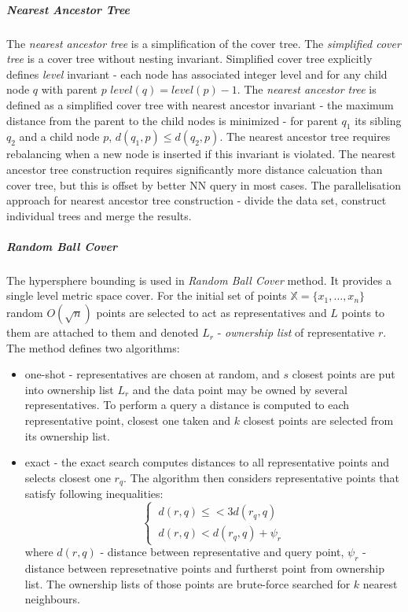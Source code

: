 \subparagraph*{Nearest Ancestor Tree}
The \textit{nearest ancestor tree} is a simplification of
the cover tree\cite{izbickifaster}.
The \textit{simplified cover tree} is a cover tree without nesting invariant.
Simplified cover tree explicitly defines \textit{level} invariant - each node
has associated integer level and for any child node $ q $ with parent $ p $ $ level(q) = level(p) - 1 $. 
The \textit{nearest ancestor tree} is defined as a simplified cover tree with
nearest ancestor invariant - the maximum distance from the parent to the child
nodes is minimized -  for parent $ q_1 $ its sibling $ q_2 $ and a child node $
p $, $ d(q_1, p) \leq d(q_2, p)$\cite{izbickifaster}.
The nearest ancestor tree requires rebalancing when a new node is inserted if
this invariant is violated. 
The nearest ancestor tree construction requires significantly more distance
calcuation than cover tree, but this is offset by better NN query in most
cases\cite{izbickifaster}.
The parallelisation approach for nearest ancestor tree construction - divide the
data set, construct individual trees and merge the results.  

\subparagraph*{Random Ball Cover}
The hypersphere bounding is used in \textit{Random Ball Cover}
method\cite{Cayton6267877}. It provides a single level metric space cover. For
the initial set of points $ \mathbb{X} = \{ x_1, \ldots , x_n \} $ 
random $ O(\sqrt{n}) $ points are selected to act as representatives and 
$ L $ points to them are attached to them and denoted $ L_r $ -
\textit{ownership list} of representative $ r $.
The method defines two algorithms:
\begin{itemize}
  \item one-shot - representatives are chosen at random, and $ s $ closest
  points are put into ownership list $ L_r $ and the data point may be owned by
  several representatives. To perform a query a distance is computed to each
  representative point, closest one taken and $ k $ closest points are selected from its ownership list. 
  \item exact - the exact search computes distances to all representative points
  and selects closest one $ r_q $. The algorithm then considers representative
  points that satisfy following inequalities:
  \[
  \left\{
  \begin{array}{ll} 
  \ d(r,q)  \leq< 3 d(r_q, q) \\
  \ d(r,q)  < d(r_q, q) + \psi_{r}   
 \end{array}
 \right.
  \]
  where $ d(r,q) $  - distance between representative and query point, $
  \psi_{r} $ - distance between represetnative points and furtherst point from
  ownership list. The ownership lists of those points are brute-force searched
  for $ k $ nearest neighbours.
  
\end{itemize} 

